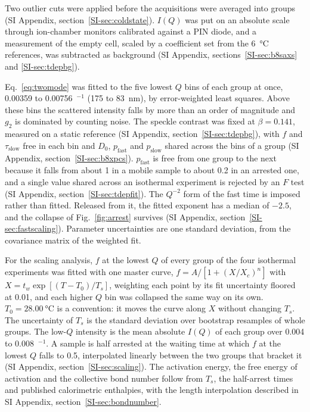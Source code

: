 \documentclass[journal=nalefd,manuscript=letter,layout=traditional]{achemso}
\newcommand{\Ainv}{\text{\AA}$^{-1}$}
\begin{document}
Two outlier cuts were applied before the acquisitions were averaged into groups (SI Appendix, section~\ref*{SI-sec:coldstate}). $I(Q)$ was put on an absolute scale through ion-chamber monitors calibrated against a PIN diode, and a measurement of the empty cell, scaled by a coefficient set from the \SI{6}{\degreeCelsius} references, was subtracted as background (SI Appendix, sections~\ref*{SI-sec:b8saxs} and \ref*{SI-sec:tdepbg}).

Eq.~\ref{eq:twomode} was fitted to the five lowest $Q$ bins of each group at once, 0.00359 to 0.00756~\Ainv{} (175 to \SI{83}{\nano\meter}), by error-weighted least squares. Above these bins the scattered intensity falls by more than an order of magnitude and $g_2$ is dominated by counting noise. The speckle contrast was fixed at $\beta=0.141$, measured on a static reference (SI Appendix, section~\ref*{SI-sec:tdepbg}), with $f$ and $\tau_{\mathrm{slow}}$ free in each bin and $D_0$, $p_{\mathrm{fast}}$ and $p_{\mathrm{slow}}$ shared across the bins of a group (SI Appendix, section~\ref*{SI-sec:b8xpcs}). $p_{\mathrm{fast}}$ is free from one group to the next because it falls from about 1 in a mobile sample to about 0.2 in an arrested one, and a single value shared across an isothermal experiment is rejected by an $F$ test (SI Appendix, section~\ref*{SI-sec:tdepfit}). The $Q^{-2}$ form of the fast time is imposed rather than fitted. Released from it, the fitted exponent has a median of $-2.5$, and the collapse of Fig.~\ref{fig:arrest} survives (SI Appendix, section~\ref*{SI-sec:fastscaling}). Parameter uncertainties are one standard deviation, from the covariance matrix of the weighted fit.

For the scaling analysis, $f$ at the lowest $Q$ of every group of the four isothermal experiments was fitted with one master curve, $f=A/[1+(X/X_c)^n]$ with $X=t_w\exp[(T-T_0)/T_s]$, weighting each point by its fit uncertainty floored at 0.01, and each higher $Q$ bin was collapsed the same way on its own. $T_0=\SI{28.00}{\degreeCelsius}$ is a convention: it moves the curve along $X$ without changing $T_s$. The uncertainty of $T_s$ is the standard deviation over bootstrap resamples of whole groups. The low-$Q$ intensity is the mean absolute $I(Q)$ of each group over 0.004 to 0.008~\Ainv. A sample is half arrested at the waiting time at which $f$ at the lowest $Q$ falls to 0.5, interpolated linearly between the two groups that bracket it (SI Appendix, section~\ref*{SI-sec:scaling}). The activation energy, the free energy of activation and the collective bond number follow from $T_s$, the half-arrest times and published calorimetric enthalpies, with the length interpolation described in SI Appendix, section~\ref*{SI-sec:bondnumber}.
\end{document}
